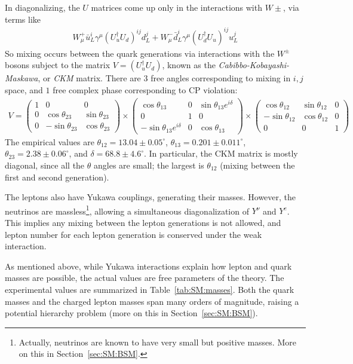 In diagonalizing, the $U$ matrices come up only in the interactions with $W\pm$, via terms like
\begin{align}
  W^+_\mu\bar{u}_L^i\gamma^\mu\left(U_u^\dagger U_d\right)^{ij} d_L^j + W^-_\mu\bar{d}_L^i\gamma^\mu\left(U_d^\dagger U_u\right)^{ij} u_L^j
\end{align}
So mixing occurs between the quark generations via interactions with the $W^\pm$ bosons subject to the matrix $V=\left(U_u^\dagger U_d\right)$, known as the \textit{Cabibbo-Kobayashi-Maskawa}, or \textit{CKM} matrix.
There are $3$ free angles corresponding to mixing in $i,j$ space, and $1$ free complex phase corresponding to CP violation:
\begin{align}
V = \begin{pmatrix} 1 & 0 & 0 \\ 0 & \cos\theta_{23} & \sin\theta_{23} \\ 0 & -\sin\theta_{23} & \cos\theta_{23} \end{pmatrix}\times
\begin{pmatrix} \cos\theta_{13} & 0 & \sin\theta_{13}e^{i\delta} \\ 0 & 1 & 0 \\-\sin\theta_{13}e^{i\delta} & 0 & \cos\theta_{13} \end{pmatrix}\times
\begin{pmatrix} \cos\theta_{12} & \sin\theta_{12} & 0 \\ -\sin\theta_{12} & \cos\theta_{12} & 0 \\ 0 & 0 & 1 \end{pmatrix}
\end{align}
The empirical values are $\theta_{12}=13.04\pm0.05^\circ$, $\theta_{13}=0.201\pm0.011^\circ$, $\theta_{23}=2.38\pm0.06^\circ$, and $\delta=68.8\pm4.6^\circ$.
In particular, the CKM matrix is mostly diagonal, since all the $\theta$ angles are small; the largest is $\theta_{12}$ (mixing between the first and second generation).

The leptons also have Yukawa couplings, generating their masses.
However, the neutrinos are massless\footnote{Actually, neutrinos are known to have very small but positive masses. More on this in Section~\ref{sec:SM:BSM}.}, allowing a simultaneous diagonalization of $Y^\nu$ and $Y^e$.
This implies any mixing between the lepton generations is not allowed, and lepton number for each lepton generation is conserved under the weak interaction.

As mentioned above, while Yukawa interactions explain how lepton and quark masses are possible, the actual values are free parameters of the theory.
The experimental values are summarized in Table~\ref{tab:SM:masses}.
Both the quark masses and the charged lepton masses span many orders of magnitude, raising a potential hierarchy problem (more on this in Section~\ref{sec:SM:BSM}).

